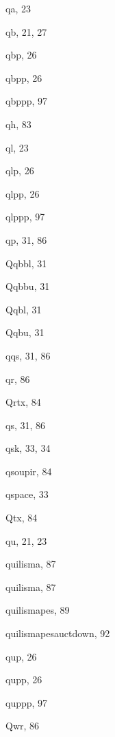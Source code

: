 \begin{theindex}
  \indexspace

  \item {\Bslash qa}, 23
  \item {\Bslash qb}, 21, 27
  \item {\Bslash qbp}, 26
  \item {\Bslash qbpp}, 26
  \item {\Bslash qbppp}, 97
  \item {\Bslash qh}, 83
  \item {\Bslash ql}, 23
  \item {\Bslash qlp}, 26
  \item {\Bslash qlpp}, 26
  \item {\Bslash qlppp}, 97
  \item {\Bslash qp}, 31, 86
  \item {\Bslash Qqbbl}, 31
  \item {\Bslash Qqbbu}, 31
  \item {\Bslash Qqbl}, 31
  \item {\Bslash Qqbu}, 31
  \item {\Bslash qqs}, 31, 86
  \item {\Bslash qr}, 86
  \item {\Bslash Qrtx}, 84
  \item {\Bslash qs}, 31, 86
  \item {\Bslash qsk}, 33, 34
  \item {\Bslash qsoupir}, 84
  \item {\Bslash qspace}, 33
  \item {\Bslash Qtx}, 84
  \item {\Bslash qu}, 21, 23
  \item quilisma, 87
  \item {\Bslash quilisma}, 87
  \item {\Bslash quilismapes}, 89
  \item {\Bslash quilismapesauctdown}, 92
  \item {\Bslash qup}, 26
  \item {\Bslash qupp}, 26
  \item {\Bslash quppp}, 97
  \item {\Bslash Qwr}, 86

  \indexspace


\end{theindex}
